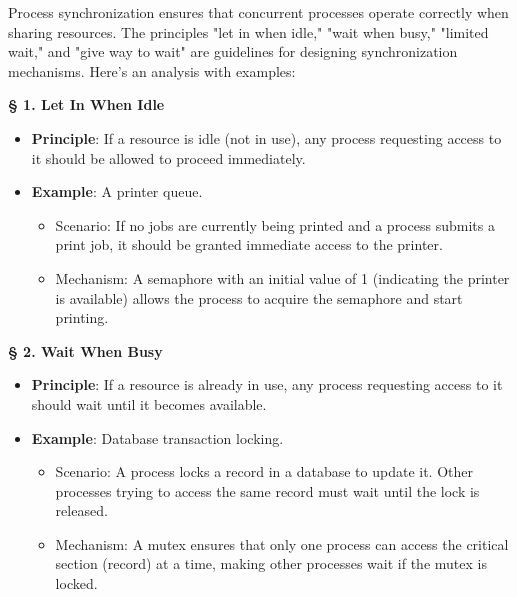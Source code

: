 \documentclass[a4paper]{book}
\newcommand{\sfbf}[1]{{\normalsize\textsf{\textbf{§ #1}}}}
\begin{document}
Process synchronization ensures that concurrent processes operate correctly when sharing resources. The principles "let in when idle," "wait when busy," "limited wait," and "give way to wait" are guidelines for designing synchronization mechanisms. Here’s an analysis with examples:

\hrulefill

\sfbf{1. Let In When Idle}

\begin{itemize}
\item 
\textbf{Principle}: If a resource is idle (not in use), any process requesting access to it should be allowed to proceed immediately.

\item 
\textbf{Example}: A printer queue.
\begin{itemize}
\item 
Scenario: If no jobs are currently being printed and a process submits a print job, it should be granted immediate access to the printer.

\item 
Mechanism: A semaphore with an initial value of 1 (indicating the printer is available) allows the process to acquire the semaphore and start printing.

\end{itemize}

\end{itemize}

\sfbf{2. Wait When Busy}

\begin{itemize}
\item 
\textbf{Principle}: If a resource is already in use, any process requesting access to it should wait until it becomes available.

\item 
\textbf{Example}: Database transaction locking.
\begin{itemize}
\item 
Scenario: A process locks a record in a database to update it. Other processes trying to access the same record must wait until the lock is released.

\item 
Mechanism: A mutex ensures that only one process can access the critical section (record) at a time, making other processes wait if the mutex is locked.

\end{itemize}

\end{itemize}
\end{document}
